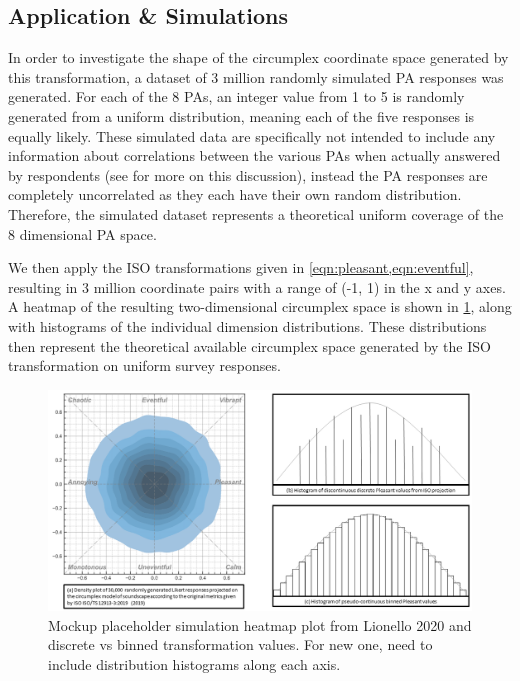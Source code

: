 \subsection{Application \& Simulations}
In order to investigate the shape of the circumplex coordinate space generated by this transformation, a dataset of 3 million randomly simulated PA responses was generated. For each of the 8 PAs, an integer value from 1 to 5 is randomly generated from a uniform distribution, meaning each of the five responses is equally likely. These simulated data are specifically not intended to include any information about correlations between the various PAs when actually answered by respondents (see \citep{Lionello2021Introducing} for more on this discussion), instead the PA responses are completely uncorrelated as they each have their own random distribution. Therefore, the simulated dataset represents a theoretical uniform coverage of the 8 dimensional PA space.

We then apply the ISO transformations given in \cref{eqn:pleasant,eqn:eventful}, resulting in 3 million coordinate pairs with a range of (-1, 1) in the x and y axes. A heatmap of the resulting two-dimensional circumplex space is shown in \cref{fig:isoheatmap}, along with histograms of the individual dimension distributions. These distributions then represent the theoretical available circumplex space generated by the ISO transformation on uniform survey responses.

\begin{figure}
  \includegraphics[width=\textwidth]{figures/Combined_sim_hist_mockup.png}
  \caption{Mockup placeholder simulation heatmap plot from Lionello 2020 and discrete vs binned transformation values. For new one, need to include distribution histograms along each axis.%
    \label{fig:isoheatmap}
  }
\end{figure}


